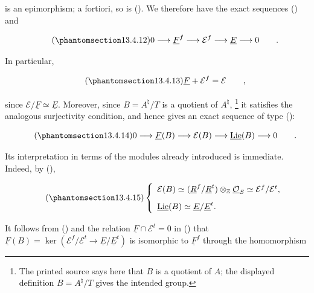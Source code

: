 \noindent
is an epimorphism; a fortiori, so is ().  We therefore have the
exact sequences () and

\begin{equation}\tag{\SGARefTarget{sga7.sga7i.eix.n13-4-12}{13.4.12}}
 0\longrightarrow\underline F^f\longrightarrow\mathcal E^f
 \longrightarrow\underline E\longrightarrow0\qquad .
\end{equation}

\noindent
In particular,

\begin{equation}\tag{\SGARefTarget{sga7.sga7i.eix.n13-4-13}{13.4.13}}
 \underline F+\mathcal E^f=\mathcal E\qquad ,
\end{equation}

\noindent
since $\mathcal E/\underline F\simeq\underline E$.  Moreover, since
$B=A^\natural/T$ is a quotient of $A^\natural$,
\footnote{The printed source says here that $B$ is a quotient of $A$;
the displayed definition $B=A^\natural/T$ gives the intended group.}
it satisfies the analogous surjectivity condition, and hence gives an
exact sequence of type ():

\begin{equation}\tag{\SGARefTarget{sga7.sga7i.eix.n13-4-14}{13.4.14}}
 0\longrightarrow\underline F(B)\longrightarrow\mathcal E(B)
 \longrightarrow\underline{\operatorname{Lie}}(B)
 \longrightarrow0\qquad .
\end{equation}

\noindent
Its interpretation in terms of the modules already introduced is
immediate.  Indeed, by (),

\begin{equation}\tag{\SGARefTarget{sga7.sga7i.eix.n13-4-15}{13.4.15}}
 \left\{
 \begin{array}{l}
  \mathcal E(B)\simeq
  (\underline R^f/\underline R^t)\otimes_{\mathbb Z}
  \underline{\mathcal O}_S
  \simeq\mathcal E^f/\mathcal E^t,\\[2ex]
  \underline{\operatorname{Lie}}(B)
  \simeq\underline E/\underline E^t.
 \end{array}
 \right.
\end{equation}

\noindent
It follows from () and the relation
$\underline F\cap\mathcal E^t=0$ in () that
$\underline F(B)=\ker(\mathcal E^f/\mathcal E^t
\longrightarrow\underline E/\underline E^t)$ is isomorphic to
$\underline F^f$ through the homomorphism

